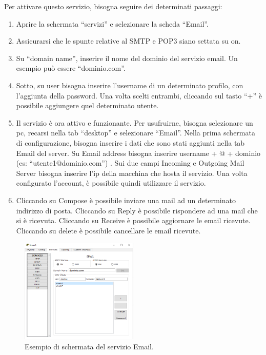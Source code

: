 Per attivare questo servizio, bisogna seguire dei determinati passaggi:

\begin{enumerate}
    \item Aprire la schermata “servizi” e selezionare la scheda “Email”.
    \item Assicurarsi che le spunte relative al SMTP e POP3 siano settata su on.
    \item Su “domain name”, inserire il nome del dominio del servizio email. Un esempio può essere “dominio.com”.
    \item Sotto, su user bisogna inserire l’username di un determinato profilo, con l’aggiunta della password. Una volta scelti entrambi, cliccando sul tasto “+” è possibile aggiungere quel determinato utente.
    \item Il servizio è ora attivo e funzionante. Per usufruirne, bisogna selezionare un pc, recarsi nella tab “desktop” e selezionare “Email”. Nella prima schermata di configurazione, bisogna inserire i dati che sono stati aggiunti nella tab Email del server. Su Email address bisogna inserire username + @ + dominio (es: “utente1@dominio.com”) . Sui due campi Incoming e Outgoing Mail Server bisogna inserire l’ip della macchina che hosta il servizio. Una volta configurato l’account, è possibile quindi utilizzare il servizio.
    \item Cliccando su Compose è possibile inviare una mail ad un determinato indirizzo di posta. Cliccando su Reply è possibile rispondere ad una mail che si è ricevuta. Cliccando su Receive è possibile aggiornare le email ricevute. Cliccando su delete è possibile cancellare le email ricevute.
\end{enumerate}

\begin{figure}[htbp]
    \centering
    \includegraphics[width=0.5\textwidth]{images/06.servizi-rete/email/01.conf-server.png}
    \caption{Esempio di schermata del servizio Email.}
    \label{fig:email-conf-server}
\end{figure}


